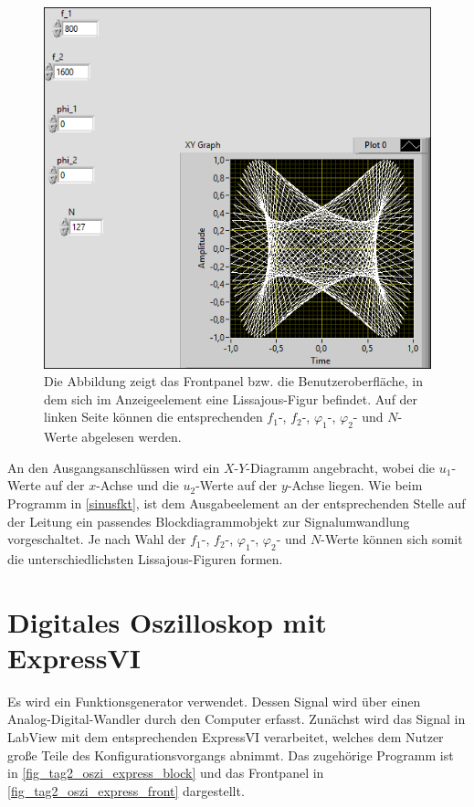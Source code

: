 \documentclass[
a4paper,
12pt,
pagesize,
ngerman
]{scrartcl}
\begin{document}
	\begin{figure}[H]
		\centering
		\includegraphics[width=1.0\textwidth]{EIRE2018Dateien/Tag1/lissajous-bilder/Lissajousp}
		\caption{Die Abbildung zeigt das Frontpanel bzw. die Benutzeroberfläche, in dem sich im Anzeigeelement eine Lissajous-Figur befindet. Auf der linken Seite können die entsprechenden $f_1$-, $f_2$-, $\varphi_1$-, $\varphi_2$- und $N$-Werte abgelesen werden.}
		\label{lissajous}
	\end{figure}

	\noindent An den Ausgangsanschlüssen wird ein $X$-$Y$-Diagramm angebracht, wobei die $u_1$-Werte auf der $x$-Achse und die $u_2$-Werte auf der $y$-Achse liegen. Wie beim Programm in \cref{sinusfkt}, ist dem Ausgabeelement an der entsprechenden Stelle auf der Leitung ein passendes Blockdiagrammobjekt zur Signalumwandlung vorgeschaltet. Je nach Wahl der $f_1$-, $f_2$-, $\varphi_1$-, $\varphi_2$- und $N$-Werte können sich somit die unterschiedlichsten Lissajous-Figuren formen.
	
	\newpage
	
	
	\section{Digitales Oszilloskop mit ExpressVI}
	Es wird ein Funktionsgenerator verwendet.
	Dessen Signal wird über einen Analog-Digital-Wandler durch den Computer erfasst.
	Zunächst wird das Signal in LabView mit dem entsprechenden ExpressVI verarbeitet, welches dem Nutzer große Teile des Konfigurationsvorgangs abnimmt.
	Das zugehörige Programm ist in \cref{fig_tag2_oszi_express_block} und das Frontpanel in \cref{fig_tag2_oszi_express_front} dargestellt.
	
\end{document}
